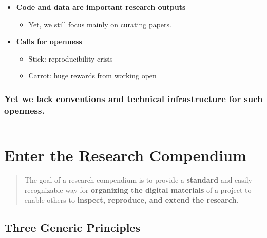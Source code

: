 \documentclass[
  letterpaper,
  DIV=11,
  numbers=noendperiod]{scrreprt}
\providecommand{\tightlist}{%
  \setlength{\itemsep}{0pt}\setlength{\parskip}{0pt}}\usepackage{longtable,booktabs,array}
\begin{document}
\begin{itemize}
\item
  \textbf{Code and data are important research outputs}

  \begin{itemize}
  \tightlist
  \item
    Yet, we still focus mainly on curating papers.
  \end{itemize}
\item
  \textbf{Calls for openness}

  \begin{itemize}
  \tightlist
  \item
    Stick: reproducibility crisis
  \item
    Carrot: huge rewards from working open
  \end{itemize}
\end{itemize}

\hypertarget{yet-we-lack-conventions-and-technical-infrastructure-for-such-openness.}{%
\subsubsection*{Yet we lack conventions and technical infrastructure for
such
openness.}\label{yet-we-lack-conventions-and-technical-infrastructure-for-such-openness.}}

\begin{center}\rule{0.5\linewidth}{0.5pt}\end{center}

\hypertarget{enter-the-research-compendium}{%
\section*{Enter the Research
Compendium}\label{enter-the-research-compendium}}

\begin{quote}
The goal of a research compendium is to provide a \textbf{standard} and
easily recognizable way for \textbf{organizing the digital materials} of
a project to enable others to \textbf{inspect, reproduce, and extend the
research}.
\end{quote}

\hypertarget{three-generic-principles}{%
\subsection*{Three Generic Principles}\label{three-generic-principles}}
\end{document}
